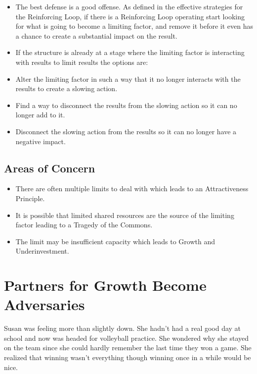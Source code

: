 \documentclass[]{memoir}
\begin{document}
\begin{itemize}
\itemsep1pt\parskip0pt
\item
  The best defense is a good offense. As defined in the effective
  strategies for the Reinforcing Loop, if there is a Reinforcing Loop
  operating start looking for what is going to become a limiting factor,
  and remove it before it even has a chance to create a substantial
  impact on the result.
\item
  If the structure is already at a stage where the limiting factor is
  interacting with results to limit results the options are:
\item
  Alter the limiting factor in such a way that it no longer interacts
  with the results to create a slowing action.
\item
  Find a way to disconnect the results from the slowing action so it can
  no longer add to it.
\item
  Disconnect the slowing action from the results so it can no longer
  have a negative impact.
\end{itemize}

\subsection{Areas of Concern}

\begin{itemize}
\itemsep1pt\parskip0pt
\item
  There are often multiple limits to deal with which leads to an
  Attractiveness Principle.
\item
  It is possible that limited shared resources are the source of the
  limiting factor leading to a Tragedy of the Commons.
\item
  The limit may be insufficient capacity which leads to Growth and
  Underinvestment.
\end{itemize}

\section{Partners for Growth Become Adversaries}

Susan was feeling more than slightly down. She hadn't had a real good
day at school and now was headed for volleyball practice. She wondered
why she stayed on the team since she could hardly remember the last time
they won a game. She realized that winning wasn't everything though
winning once in a while would be nice.
\end{document}
